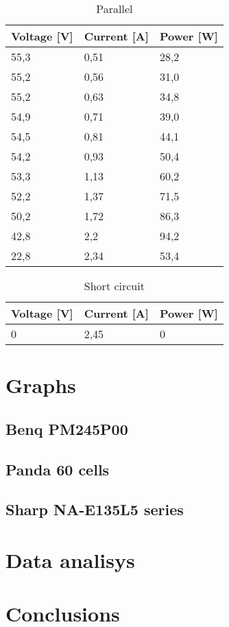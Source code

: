 \documentclass[12pt]{article}
\begin{document}
\begin{table}[!h]
	\centering
	\begin{tabular}{|p{2cm}|p{2cm}|p{2cm}|}
		\hline
		\rowcolor{RedOrange!80} Voltage [V] & Current [A] & Power [W] \\
		\hline
		\rowcolor{Peach!70}   55,3          & 0,51        & 28,2      \\
		\hline
		\rowcolor{Melon!70}     55,2        & 0,56        & 31,0      \\
		\hline
		\rowcolor{Peach!70}      55,2       & 0,63        & 34,8      \\
		\hline
		\rowcolor{Melon!70}        54,9     & 0,71        & 39,0      \\
		\hline
		\rowcolor{Peach!70}        54,5     & 0,81        & 44,1      \\
		\hline
		\rowcolor{Melon!70}    54,2         & 0,93        & 50,4      \\
		\hline
		\rowcolor{Peach!70}    53,3         & 1,13        & 60,2      \\
		\hline
		\rowcolor{Melon!70}     52,2        & 1,37        & 71,5      \\
		\hline
		\rowcolor{Peach!70}      50,2       & 1,72        & 86,3      \\
		\hline
		\rowcolor{Melon!70}       42,8      & 2,2         & 94,2      \\
		\hline
		\rowcolor{Peach!70}        22,8     & 2,34        & 53,4      \\
        \hline
	\end{tabular}
	\caption{Parallel}
	\label{tab:my_label}
\end{table}

\begin{table}[!h]
	\centering
	\begin{tabular}{|p{2cm}|p{2cm}|p{2cm}|}
		\hline
		\rowcolor{Red!80} Voltage [V] & Current [A] & Power [W] \\
		\hline
		\rowcolor{Red!60} 0           & 2,45        & 0         \\
		\hline
	\end{tabular}
	\caption{Short circuit}
	\label{tab:my_label}
\end{table}
\section{Graphs}
\subsection{Benq PM245P00}
\subsection{Panda 60 cells}
\subsection{Sharp NA-E135L5 series}
\section{Data analisys}
\section{Conclusions}
\end{document}
